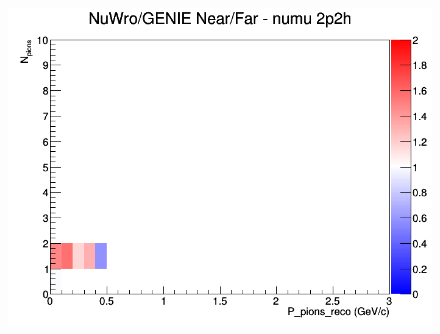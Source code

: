 \documentclass[12pt]{article}
\begin{document}
\begin{figure}[h]
\endminipage
{}
\includegraphics[width=\linewidth]{eff_N_P/LAr/pions/ratios/2p2h_NuWro_GENIE_numu_NF_N_P.png}
\endminipage
\newline
\end{figure}
\clearpage
\end{document}
